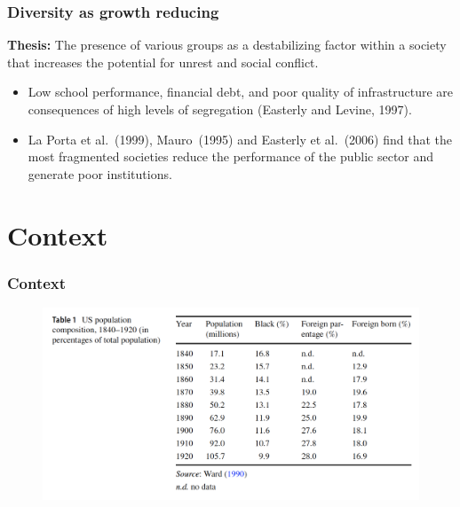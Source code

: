 \documentclass[pdftex,12pt,xcolor=pdftex,table]{beamer}
\begin{document}
\begin{frame}
\frametitle{Diversity as growth reducing}

\small{
\textbf{Thesis:} The presence of various groups as a destabilizing factor within a society that increases the potential for unrest and social conflict.

\begin{itemize}
\item Low school performance, financial debt, and poor quality of infrastructure are consequences of high levels of segregation (Easterly and Levine, 1997).
\item La Porta et al. (1999), Mauro (1995) and Easterly et al. (2006) find that the most fragmented societies reduce the performance of the public sector and generate poor institutions.
\end{itemize}
}


\end{frame}


\section{Context}

\begin{frame}
\frametitle{Context}

\begin{figure}
	\begin{center}
	\includegraphics[scale=0.42]{context.png} 
	\end{center}
\end{figure}

\end{frame}

\end{document}
